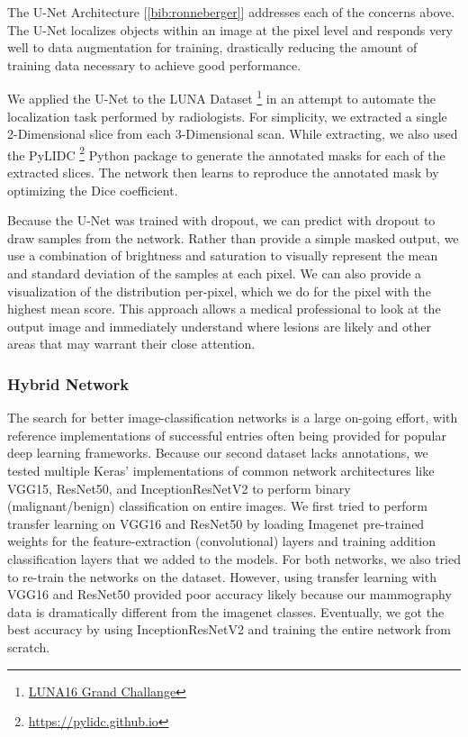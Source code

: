 \documentclass[12pt]{article}
\begin{document}
{The U-Net Architecture [\ref{bib:ronneberger}] addresses each of the concerns above. The U-Net localizes objects within an image at the pixel level and responds very well to data augmentation for training, drastically reducing the amount of training data necessary to achieve good performance.

We applied the U-Net to the LUNA Dataset \footnote{\href{http://luna16.grand-challenge.org}{LUNA16 Grand Challange}} in an attempt to automate the localization task performed by radiologists. For simplicity, we extracted a single 2-Dimensional slice from each 3-Dimensional scan. While extracting, we also used the PyLIDC \footnote{\href{https://pylidc.github.io}{https://pylidc.github.io}} Python package to generate the annotated masks for each of the extracted slices. The network then learns to reproduce the annotated mask by optimizing the Dice coefficient.

Because the U-Net was trained with dropout, we can predict with dropout to draw samples from the network. Rather than provide a simple masked output, we use a combination of brightness and saturation to visually represent the mean and standard deviation of the samples at each pixel. We can also provide a visualization of the distribution per-pixel, which we do for the pixel with the highest mean score. This approach allows a medical professional to look at the output image and immediately understand where lesions are likely and other areas that may warrant their close attention.

\subsubsection*{Hybrid Network}
The search for better image-classification networks is a large on-going effort, with reference implementations of successful entries often being provided for popular deep learning frameworks. Because our second dataset lacks annotations, we tested multiple Keras' implementations of common network architectures like VGG15, ResNet50, and InceptionResNetV2 to perform binary (malignant/benign) classification on entire images. We first tried to perform transfer learning on VGG16 and ResNet50 by loading Imagenet pre-trained weights for the feature-extraction (convolutional) layers and training addition classification layers that we added to the models. For both networks, we also tried to re-train the networks on the dataset. However, using transfer learning with VGG16 and ResNet50 provided poor accuracy likely because our mammography data is dramatically different from the imagenet classes. Eventually, we got the best accuracy by using InceptionResNetV2 and training the entire network from scratch.

}
\end{document}

